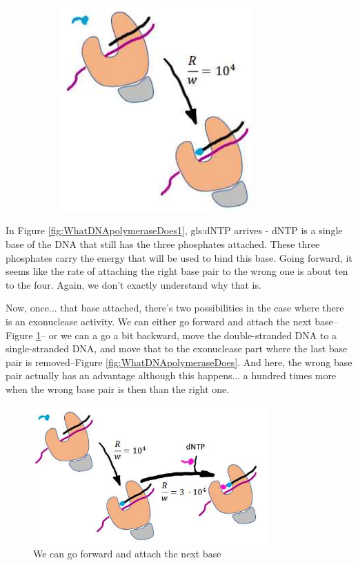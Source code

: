 \documentclass[]{article}
\begin{document}
\begin{figure}[H]
\begin{subfigure}[t]{0.45\textwidth}
		\includegraphics[width=0.8\textwidth]{WhatDNApolymeraseDoes1}
	\end{subfigure}
\end{figure} 


In Figure \ref{fig:WhatDNApolymeraseDoes1}, \gls{gls:dNTP} arrives - dNTP is a single base of the DNA that still has the three phosphates attached.
These three phosphates carry the energy that will be used to bind this base.
Going forward, it seems like the rate of attaching
the right base pair to the wrong one
is about ten to the four. Again, we don't exactly understand
why that is.

Now, once... that base attached,
there's two possibilities
in the case where there is
an exonuclease activity.
We can either go forward
and attach the next base--Figure \ref{fig:WhatDNApolymeraseDoes2}--
or we can a go a bit backward,
move the double-stranded DNA
to a single-stranded DNA,
and move that to the exonuclease part
where the last base pair is removed--Figure \ref{fig:WhatDNApolymeraseDoes}.
And here, the wrong base pair
actually has an advantage
although this happens...
a hundred times more
when the wrong base pair is then
than the right one.
\begin{figure}[H]
	\caption{We can  go forward
		and attach the next base}\label{fig:WhatDNApolymeraseDoes2}
	\includegraphics[width=0.8\textwidth]{WhatDNApolymeraseDoes2}
\end{figure} 
\end{document}
